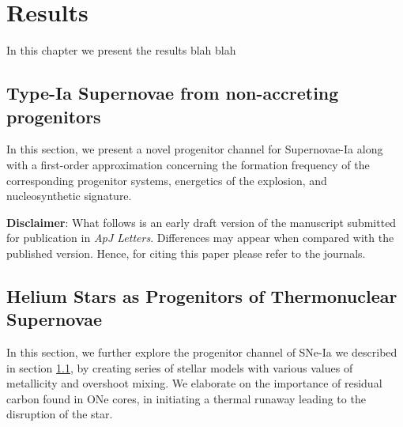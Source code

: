 \documentclass[../../main/thesis_msc.tex]{subfiles}
\begin{document}
	\chapter{Results}
	
	
	In this chapter we present the results blah blah
	
	\newpage
	
	\null\newpage
	
	
	\section{Type-Ia Supernovae from non-accreting progenitors}\label{sec:results1}
	
	
		\vspace{3cm}
		
		 In this section, we present a novel progenitor channel for Supernovae-Ia along with a first-order approximation concerning the formation frequency of the corresponding progenitor systems, energetics of the explosion, and nucleosynthetic signature.
		
		\vspace{15cm}
		\textbf{Disclaimer}: What follows is an early draft version of the manuscript submitted for publication in \textit{ApJ Letters}. Differences may appear when compared with the published version. Hence, for citing this paper please refer to the journals.
		
		\newpage
	
		
            
           
            
            
     \null\newpage
     \section{Helium Stars as Progenitors of Thermonuclear Supernovae}\label{sec:results2}
     
     
    	 \vspace{3cm}
		
		In this section, we further explore the progenitor channel of SNe-Ia we described in section \ref{sec:results1}, by creating series of stellar models with various values of metallicity and overshoot mixing. We elaborate on the importance of residual carbon found in ONe cores, in initiating a thermal runaway leading to the disruption of the star.
		
\end{document}
